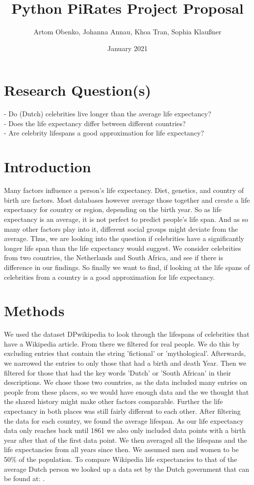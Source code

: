 \documentclass{article}
\title{Python PiRates Project Proposal}
\author{Artom Obenko, Johanna Annau, Khoa Tran, Sophia Klaußner}
\date{January 2021}
\begin{document}
	
\maketitle
	
\section{Research Question(s)}
	- Do (Dutch) celebrities live longer than the average life expectancy?\\
	- Does the life expectancy differ between different countries?\\
	- Are celebrity lifespans a good approximation for life expectancy?\\
	
\section{Introduction}
Many factors influence a person's life expectancy. Diet, genetics, and country of birth are factors. Most databases however average those together and create a life expectancy for country or region, depending on the birth year. %
So as life expectancy is an average, it is not perfect to predict people's life span. And as so many other factors play into it, different social groups might deviate from the average. Thus, we are looking into the question if celebrities have a significantly longer life span than the life expectancy would suggest. We consider celebrities from two countries, the Netherlands and South Africa, and see if there is difference in our findings. So finally we want to find, if looking at the life spans of celebrities from a country is a good approximation for life expectancy.

\section{Methods}
We used the dataset DPwikipedia to look through the lifespans of celebrities that have a Wikipedia article. From there we filtered for real people. We do this by excluding entries that contain the string 'fictional' or 'mythological'. Afterwards, we narrowed the entries to only those that had a birth and death Year. Then we filtered for those that had the key words 'Dutch' or 'South African' in their descriptions. We chose those two countries, as the data included many entries on people from these places, so we would have enough data and the we thought that the shared history might make other factors comparable. Further the life expectancy in both places was still fairly different to each other. After filtering the data for each country, we found the average lifespan. As our life expectancy data only reaches back until 1861 we also only included data points with a birth year after that of the first data point. We then averaged all the lifespans and the life expectancies from all years since then. We assumed men and women to be 50\% of the population. To compare Wikipedia life expectancies to that of the average Dutch person we looked up a data set by the Dutch government that can be found at: \cite{Levensverwachting}. 
\end{document}
